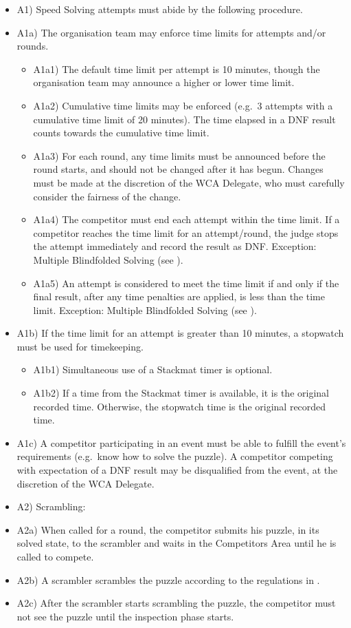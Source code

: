 \begin{itemize}
\item
  A1) Speed Solving attempts must abide by the following procedure.
\item
  A1a) The organisation team may enforce time limits for attempts and/or
  rounds.

  \begin{itemize}
  \item
    A1a1) The default time limit per attempt is 10 minutes, though the
    organisation team may announce a higher or lower time limit.
  \item
    A1a2) Cumulative time limits may be enforced (e.g.~3 attempts with a
    cumulative time limit of 20 minutes). The time elapsed in a DNF
    result counts towards the cumulative time limit.
  \item
    A1a3) For each round, any time limits must be announced before the
    round starts, and should not be changed after it has begun. Changes
    must be made at the discretion of the WCA Delegate, who must
    carefully consider the fairness of the change.
  \item
    A1a4) The competitor must end each attempt within the time limit. If
    a competitor reaches the time limit for an attempt/round, the judge
    stops the attempt immediately and record the result as DNF.
    Exception: Multiple Blindfolded Solving (see ).
  \item
    A1a5) An attempt is considered to meet the time limit if and only if
    the final result, after any time penalties are applied, is less than
    the time limit. Exception: Multiple Blindfolded Solving (see ).
  \end{itemize}
\item
  A1b) If the time limit for an attempt is greater than 10 minutes, a
  stopwatch must be used for timekeeping.

  \begin{itemize}
  \item
    A1b1) Simultaneous use of a Stackmat timer is optional.
  \item
    A1b2) If a time from the Stackmat timer is available, it is the
    original recorded time. Otherwise, the stopwatch time is the
    original recorded time.
  \end{itemize}
\item
  A1c) A competitor participating in an event must be able to fulfill
  the event's requirements (e.g.~know how to solve the puzzle). A
  competitor competing with expectation of a DNF result may be
  disqualified from the event, at the discretion of the WCA Delegate.
\item
  A2) Scrambling:
\item
  A2a) When called for a round, the competitor submits his puzzle, in
  its solved state, to the scrambler and waits in the Competitors Area
  until he is called to compete.
\item
  A2b) A scrambler scrambles the puzzle according to the regulations in
  .
\item
  A2c) After the scrambler starts scrambling the puzzle, the competitor
  must not see the puzzle until the inspection phase starts.


\end{itemize}
